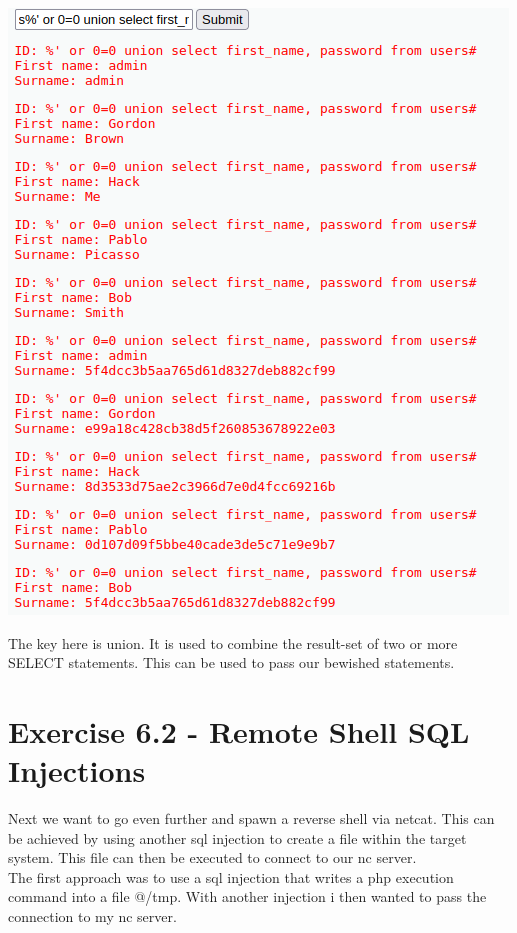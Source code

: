\documentclass[a4paper,10pt]{article}
\begin{document}
\begin{center}
 \includegraphics[scale=0.5]{sec.png}
\end{center}
The key here is union. It is used to combine the result-set of two or more SELECT statements. This can be used to pass our bewished statements.
\newpage
\section{Exercise 6.2 - Remote Shell SQL Injections}
Next we want to go even further and spawn a reverse shell via netcat. This can be achieved by using another sql injection to create a file within the target system. This file can then be executed to connect to our nc server.\\
The first approach was to use a sql injection that writes a php execution command into a file @/tmp. With another injection i then wanted to pass the connection to my nc server.
\end{document}
